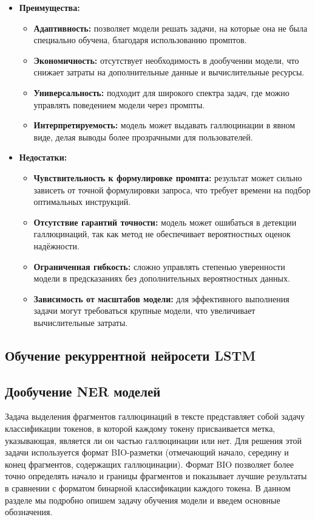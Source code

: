 \documentclass[12pt]{article}
\begin{document}
\begin{itemize}
    \item \textbf{Преимущества:}
    \begin{itemize}
        \item \textbf{Адаптивность:} позволяет модели решать задачи, на которые она не была специально обучена, благодаря использованию промптов.
        \item \textbf{Экономичность:} отсутствует необходимость в дообучении модели, что снижает затраты на дополнительные данные и вычислительные ресурсы.
        \item \textbf{Универсальность:} подходит для широкого спектра задач, где можно управлять поведением модели через промпты.
        \item \textbf{Интерпретируемость:} модель может выдавать галлюцинации в явном виде, делая выводы более прозрачными для пользователей.
    \end{itemize}
    
    \item \textbf{Недостатки:}
    \begin{itemize}
        \item \textbf{Чувствительность к формулировке промпта:} результат может сильно зависеть от точной формулировки запроса, что требует времени на подбор оптимальных инструкций.
        \item \textbf{Отсутствие гарантий точности:} модель может ошибаться в детекции галлюцинаций, так как метод не обеспечивает вероятностных оценок надёжности.
        \item \textbf{Ограниченная гибкость:} сложно управлять степенью уверенности модели в предсказаниях без дополнительных вероятностных данных.
        \item \textbf{Зависимость от масштабов модели:} для эффективного выполнения задачи могут требоваться крупные модели, что увеличивает вычислительные затраты.
    \end{itemize}
\end{itemize}

\subsection{Обучение рекуррентной нейросети LSTM}

\subsection{Дообучение NER моделей}
Задача выделения фрагментов галлюцинаций в тексте представляет собой задачу классификации токенов, в которой каждому токену присваивается метка, указывающая, является ли он частью галлюцинации или нет. Для решения этой задачи используется формат BIO-разметки (отмечающий начало, середину и конец фрагментов, содержащих галлюцинации). Формат BIO позволяет более точно определять начало и границы фрагментов и показывает лучшие результаты в сравнении с форматом бинарной классификации каждого токена. В данном разделе мы подробно опишем задачу обучения модели и введем основные обозначения.
\end{document}
